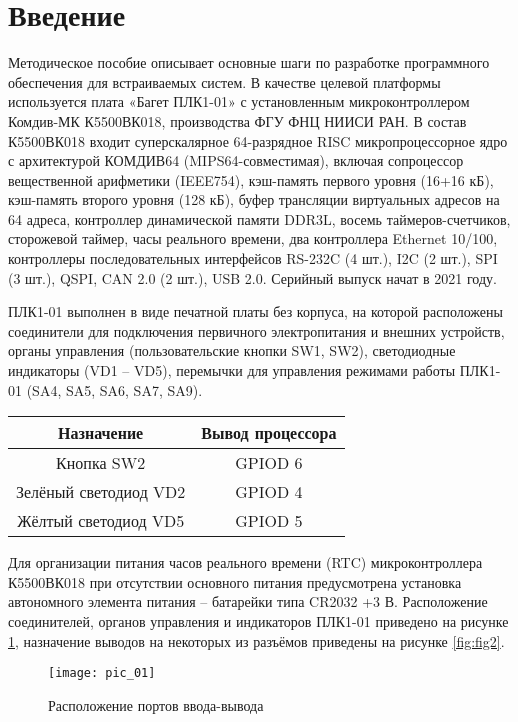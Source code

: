 \chapter*{Введение}
Методическое пособие описывает основные шаги по разработке программного обеспечения для встраиваемых систем. В качестве целевой платформы используется плата «Багет ПЛК1-01» с установленным микроконтроллером Комдив-МК К5500ВК018, производства ФГУ ФНЦ НИИСИ РАН. В состав К5500ВК018 входит суперскалярное 64-разрядное RISC микропроцессорное ядро с архитектурой КОМДИВ64 (MIPS64-совместимая), включая сопроцессор вещественной арифметики (IEEE754), кэш-память первого уровня (16+16 кБ), кэш-память второго уровня (128 кБ), буфер трансляции виртуальных адресов на 64 адреса, контроллер динамической памяти DDR3L, восемь таймеров-счетчиков, сторожевой таймер, часы реального времени, два контроллера Ethernet 10/100, контроллеры последовательных интерфейсов RS-232C (4 шт.), I2C (2 шт.), SPI (3 шт.), QSPI, CAN 2.0 (2 шт.), USB 2.0. Серийный выпуск начат в 2021 году. 

ПЛК1-01 выполнен в виде печатной платы без корпуса, на которой расположены
соединители для подключения первичного электропитания и внешних устройств, органы
управления (пользовательские кнопки SW1, SW2), светодиодные индикаторы (VD1 –
VD5), перемычки для управления режимами работы ПЛК1-01 (SA4, SA5, SA6, SA7, SA9). 

\begin{center}
	\begin{tabular}{||c | c||}
		\hline
		Назначение & Вывод процессора \\ [0.5ex]
		\hline\hline
		Кнопка SW2 & GPIOD 6 \\
		\hline
		Зелёный светодиод VD2 & GPIOD 4 \\
		\hline
		Жёлтый светодиод VD5 & GPIOD 5 \\
		\hline
	\end{tabular}
\end{center}

Для организации питания часов реального времени (RTC) микроконтроллера
К5500ВК018 при отсутствии основного питания предусмотрена установка
автономного элемента питания – батарейки типа CR2032 +3 В.
Расположение соединителей, органов управления и индикаторов ПЛК1-01
приведено на рисунке \ref{fig:fig1}, назначение выводов на некоторых из разъёмов приведены на рисунке \ref{fig:fig2}.

\begin{center}
	\begin{figure}
		\texttt{[image: pic\_01]}
		\caption{Расположение портов ввода-вывода}
		\label{fig:fig1}
	\end{figure}
\end{center}

